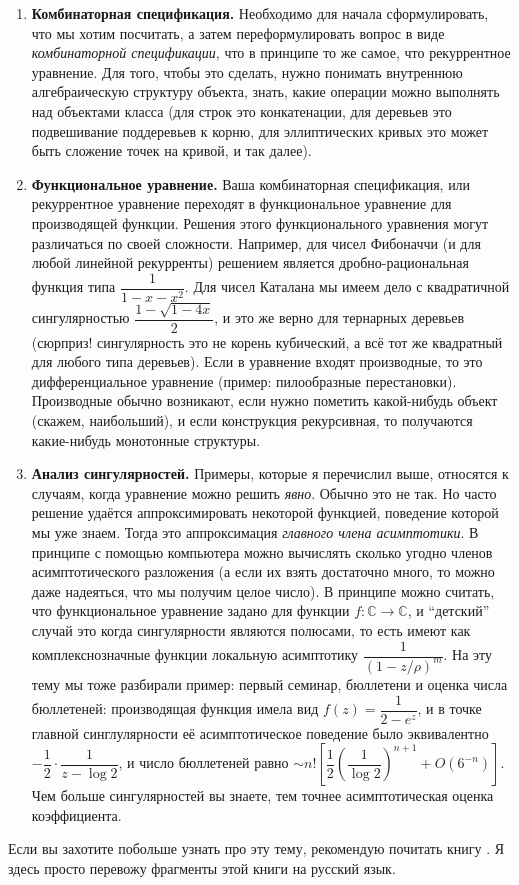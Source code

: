 \documentclass[a5paper]{article}
\theoremstyle{definition}
\begin{document}
\begin{enumerate}
\item \textbf{Комбинаторная спецификация.} Необходимо для начала сформулировать,
что мы хотим посчитать, а затем переформулировать вопрос в виде
\textit{комбинаторной спецификации}, что в принципе то же самое, что
рекуррентное уравнение. Для того, чтобы это сделать, нужно понимать внутреннюю
алгебраическую структуру объекта, знать, какие операции можно выполнять над
объектами класса (для строк это конкатенации, для деревьев это подвешивание
поддеревьев к корню, для эллиптических кривых это может быть сложение точек на
кривой, и так далее). 
\item \textbf{Функциональное уравнение.} Ваша комбинаторная спецификация, или
рекуррентное уравнение переходят в функциональное уравнение для производящей
функции.
Решения этого функционального уравнения
могут различаться по своей сложности. Например, для чисел Фибоначчи (и для любой
линейной рекурренты) решением является дробно-рациональная функция типа \(
\dfrac{1}{1 - x - x^2} \). Для чисел Каталана мы имеем дело с квадратичной
сингулярностью \( \dfrac{1 - \sqrt{1 - 4x}}{2} \), и это же верно для тернарных
деревьев (сюрприз! сингулярность это не корень кубический, а всё тот же квадратный
для любого типа деревьев). Если в уравнение входят производные, то это
дифференциальное уравнение (пример: пилообразные перестановки). Производные
обычно возникают, если нужно пометить какой-нибудь объект (скажем, наибольший),
и если конструкция рекурсивная, то получаются какие-нибудь монотонные структуры.
\item \textbf{Анализ сингулярностей.} Примеры, которые я перечислил выше,
относятся к случаям, когда уравнение можно решить \textit{явно}. Обычно это не
так. Но часто решение удаётся аппроксимировать некоторой функцией, поведение
которой мы уже знаем. Тогда это аппроксимация \textit{главного члена
асимптотики}. В принципе с помощью компьютера можно вычислять сколько угодно
членов асимптотического разложения (а если их взять достаточно много, то можно
даже надеяться, что мы получим целое число). В принципе можно считать, что
функциональное уравнение задано для функции \( f \colon \mathbb C \to \mathbb C
\), и ``детский'' случай это когда сингулярности являются полюсами, то есть
имеют как комплекснозначные функции локальную асимптотику \( \dfrac{1}{(1-z/\rho)^m}
\). На эту тему мы тоже разбирали пример: первый семинар, бюллетени и оценка
числа бюллетеней: производящая функция имела вид \( f(z) = \dfrac{1}{2 - e^z}
\), и в точке главной синглулярности её асимптотическое поведение было
эквивалентно \( -\dfrac 12 \cdot \dfrac{1}{z - \log 2} \), и число бюллетеней
равно \( \sim n! \left[ \dfrac12 \left( \dfrac{1}{\log 2} \right)^{n+1} +
O(6^{-n})\right] \).
Чем больше сингулярностей вы знаете, тем точнее асимптотическая оценка
коэффициента.
\end{enumerate}
Если вы захотите побольше узнать про эту тему, рекомендую почитать книгу
\cite{ac}. Я здесь просто перевожу фрагменты этой книги на русский язык.
\end{document}
